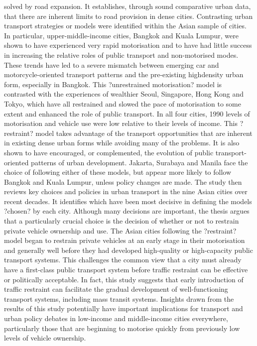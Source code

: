 solved by road expansion. It establishes, through sound comparative urban data, that there are inherent limits to road provision in dense cities. Contrasting urban transport strategies or models were identified within the Asian sample of cities. In particular, upper-middle-income cities, Bangkok and Kuala Lumpur, were shown to have experienced very rapid motorisation and to have had little success in increasing the relative roles of public transport and non-motorised modes. These trends have led to a severe mismatch between emerging car and motorcycle-oriented transport patterns and the pre-existing highdensity urban form, especially in Bangkok. This ?unrestrained motorisation? model is contrasted with the experiences of wealthier Seoul, Singapore, Hong Kong and Tokyo, which have all restrained and slowed the pace of motorisation to some extent and enhanced the role of public transport. In all four cities, 1990 levels of motorisation and vehicle use were low relative to their levels of income. This ?restraint? model takes advantage of the transport opportunities that are inherent in existing dense urban forms while avoiding many of the problems. It is also shown to have encouraged, or complemented, the evolution of public transport-oriented patterns of urban development. Jakarta, Surabaya and Manila face the choice of following either of these models, but appear more likely to follow Bangkok and Kuala Lumpur, unless policy changes are made. The study then reviews key choices and policies in urban transport in the nine Asian cities over recent decades. It identifies which have been most decisive in defining the models ?chosen? by each city. Although many decisions are important, the thesis argues that a particularly crucial choice is the decision of whether or not to restrain private vehicle ownership and use. The Asian cities following the ?restraint? model began to restrain private vehicles at an early stage in their motorisation and generally well before they had developed high-quality or high-capacity public transport systems. This challenges the common view that a city must already have a first-class public transport system before traffic restraint can be effective or politically acceptable. In fact, this study suggests that early introduction of traffic restraint can facilitate the gradual development of well-functioning transport systems, including mass transit systems. Insights drawn from the results of this study potentially have important implications for transport and urban policy debates in low-income and middle-income cities everywhere, particularly those that are beginning to motorise quickly from previously low levels of vehicle ownership.
